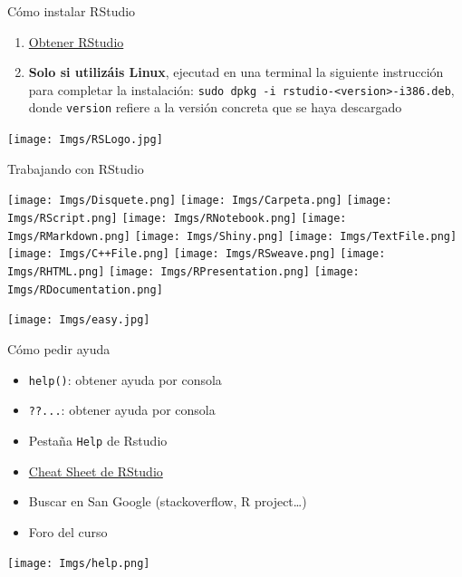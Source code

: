 \documentclass[
  ignorenonframetext,
]{beamer}
\providecommand{\tightlist}{%
  \setlength{\itemsep}{0pt}\setlength{\parskip}{0pt}}
\begin{document}
\begin{frame}[fragile]{Cómo instalar RStudio}
\protect\hypertarget{cuxf3mo-instalar-rstudio}{}

\begin{enumerate}
\tightlist
\item
  \href{http://www.rstudio.com/products/rstudio/download/}{Obtener
  RStudio}
\item
  \textbf{Solo si utilizáis Linux}, ejecutad en una terminal la
  siguiente instrucción para completar la instalación:
  \texttt{sudo\ dpkg\ -i\ rstudio-\textless{}version\textgreater{}-i386.deb},
  donde \texttt{version} refiere a la versión concreta que se haya
  descargado
\end{enumerate}

\texttt{[image: Imgs/RSLogo.jpg]}

\end{frame}

\begin{frame}{Trabajando con RStudio}
\protect\hypertarget{trabajando-con-rstudio}{}

\texttt{[image: Imgs/Disquete.png]} \texttt{[image: Imgs/Carpeta.png]}
\texttt{[image: Imgs/RScript.png]} \texttt{[image: Imgs/RNotebook.png]}
\texttt{[image: Imgs/RMarkdown.png]} \texttt{[image: Imgs/Shiny.png]}
\texttt{[image: Imgs/TextFile.png]} \texttt{[image: Imgs/C++File.png]}
\texttt{[image: Imgs/RSweave.png]} \texttt{[image: Imgs/RHTML.png]}
\texttt{[image: Imgs/RPresentation.png]}
\texttt{[image: Imgs/RDocumentation.png]}

\texttt{[image: Imgs/easy.jpg]}

\end{frame}

\begin{frame}[fragile]{Cómo pedir ayuda}
\protect\hypertarget{cuxf3mo-pedir-ayuda}{}

\begin{itemize}
\tightlist
\item
  \texttt{help()}: obtener ayuda por consola
\item
  \texttt{??...}: obtener ayuda por consola
\item
  Pestaña \texttt{Help} de Rstudio
\item
  \href{https://www.rstudio.com/wp-content/uploads/2015/02/rmarkdown-cheatsheet.pdf}{Cheat
  Sheet de RStudio}
\item
  Buscar en San Google (stackoverflow, R project\ldots)
\item
  Foro del curso
\end{itemize}

\texttt{[image: Imgs/help.png]}

\end{frame}
\end{document}

